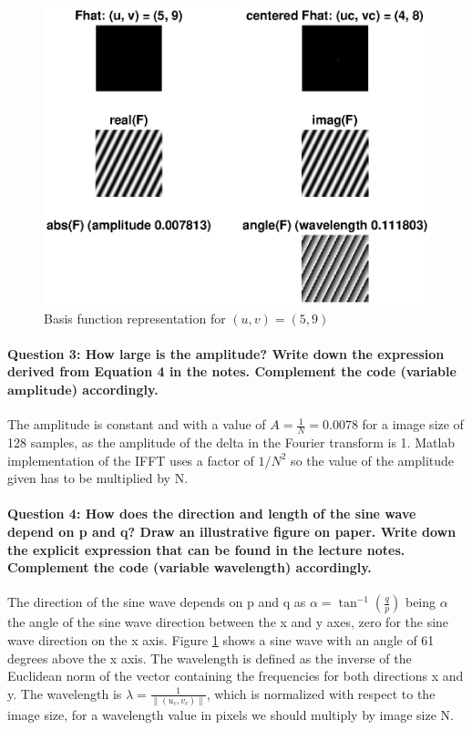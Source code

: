 \documentclass[12pt]{article}
\begin{document}
\begin{figure}[htbp]
 \centering
 \includegraphics[width=\textwidth]{q2}
 \caption{Basis function representation for \((u,v)=(5,9)\)}
 \label{fig:q2}
\end{figure}

\paragraph{Question 3:
How large is the amplitude? Write down the expression derived from Equation 4 in the notes. Complement the code (variable \(\mathbf{amplitude}\)) accordingly.}
The amplitude is constant and with a value of \(A=\frac{1}{N}=0.0078\) for a image size of 128 samples, as the amplitude of the delta in the Fourier transform is 1. Matlab implementation of the IFFT uses a factor of \(1/N^2\) so the value of the amplitude given has to be multiplied by N.

\paragraph{Question 4: How does the direction and length of the sine wave depend on p and q? Draw an illustrative figure on paper. Write down the explicit expression that can be found in
the lecture notes. Complement the code (variable wavelength) accordingly.}
The direction of the sine wave depends on p and q as \(\alpha=\tan^{-1}(\frac{q}{p})\) being \(\alpha\) the angle of the sine wave direction between the x and y axes, zero for the sine wave direction on the x axis. Figure \ref{fig:q2} shows a sine wave with an angle of 61 degrees above the x axis. The wavelength is defined as the inverse of the Euclidean norm of the vector containing the frequencies for both directions x and y. The wavelength is \(\lambda=\frac{1}{\|(u_c,v_c)\|}\), which is normalized with respect to the image size, for a wavelength value in pixels we should multiply by image size N.
\end{document}
